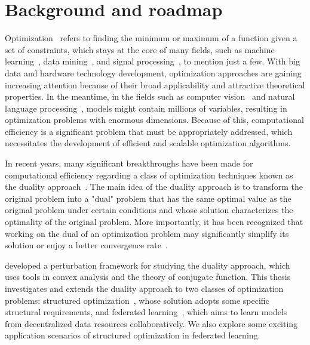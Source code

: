 \chapter{Background and roadmap}
\label{ch:Introduction}

Optimization~\citep{bert:1999} refers to finding the minimum or maximum of a function given a set of constraints, which stays at the core of many fields, such as machine learning~\citep{sra2012optimization,Bubeck15}, data mining~\citep{shi2011optimization}, and signal processing~\citep{mattingley2010real,palomar2010convex}, to mention just a few. With big data and hardware technology development, optimization approaches are gaining increasing attention because of their broad applicability and attractive theoretical properties. In the meantime, in the fields such as computer vision~\citep{krizhevsky2012imagenet} and natural language processing~\citep{wolf2020transformers}, models might contain millions of variables, resulting in optimization problems with enormous dimensions. Because of this, computational efficiency is a significant problem that must be appropriately addressed, which necessitates the development of efficient and scalable optimization algorithms. 

In recent years, many significant breakthroughs have been made for computational efficiency regarding a class of optimization techniques known as the duality approach~\citep{combettes2011proximal,shalev2013stochastic,jaggi2014communication}. The main idea of the duality approach is to transform the original problem into a "dual" problem that has the same optimal value as the original problem under certain conditions and whose solution characterizes the optimality of the original problem. More importantly, it has been recognized that working on the dual of an optimization problem may significantly simplify its solution or enjoy a better convergence rate~\citep{komodakis2015playing}. 

\citet{rockafellar1970convex} developed a perturbation framework for studying the duality approach, which uses tools in convex analysis and the theory of conjugate function. This thesis investigates and extends the duality approach to two classes of optimization problems: structured optimization~\citep{bach2012optimization,chandrasekaran2012convex}, whose solution adopts some specific structural requirements, and federated learning~\citep{wang2021field}, which aims to learn models from decentralized data resources collaboratively. We also explore some exciting application scenarios of structured optimization in federated learning. 

